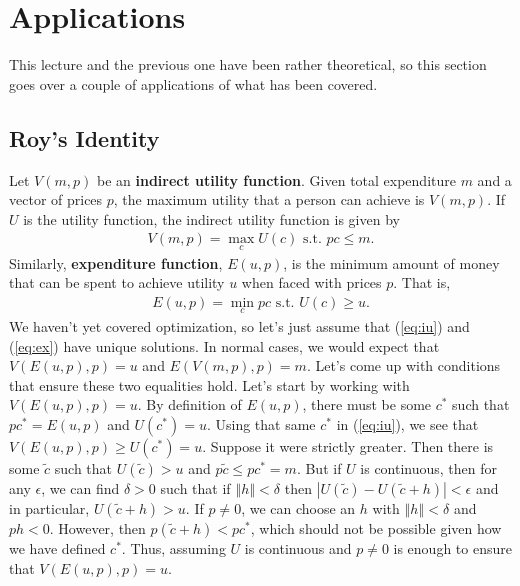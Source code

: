 \documentclass[12pt,reqno]{amsart}
\theoremstyle{definition}
\newcommand{\norm}[1]{\left\Vert {#1} \right\Vert}
\begin{document}
\section{Applications}

This lecture and the previous one have been rather theoretical, so
this section goes over a couple of applications of what has been
covered.

\subsection{Roy's Identity}

Let $V(m,p)$ be an \textbf{indirect utility function}. Given total
expenditure $m$ and a vector of prices $p$, the maximum utility that a
person can achieve is $V(m,p)$. If $U$ is the utility function, the
indirect utility function is given by
\begin{align}
  V(m,p) = \max_c U(c) \text{ s.t. } pc \leq m. \label{eq:iu}
\end{align}
Similarly,  \textbf{expenditure function}, $E(u,p)$, is the minimum
amount of money that can be spent to achieve utility $u$ when faced
with prices $p$. That is,
\begin{align}
  E(u,p) = \min_c pc \text{ s.t. } U(c) \geq u. \label{eq:ex}
\end{align}
We haven't yet covered optimization, so let's just assume that
(\ref{eq:iu}) and (\ref{eq:ex}) have unique solutions. In normal
cases, we would expect that $V(E(u,p),p) = u$ and $E(V(m,p),p) = m$.
Let's come up with conditions that ensure these two equalities
hold. Let's start by working with $V(E(u,p),p) = u$. By definition of
$E(u,p)$, there must be some $c^*$ such that $pc^* = E(u,p)$ and
$U(c^*) = u$. Using that same $c^*$ in (\ref{eq:iu}), we see that
$V(E(u,p),p) \geq U(c^*) = u$. Suppose it were strictly greater. Then
there is some $\tilde{c}$ such that $U(\tilde{c}) > u$ and $p\tilde{c}
\leq pc^* = m$. But if $U$ is continuous, then for any $\epsilon$, we
can find $\delta> 0$ such that if $\norm{h}<\delta$ then $|
U(\tilde{c}) - U(\tilde{c}+h)| < \epsilon$ and in particular,
$U(\tilde{c}+h)>u$. If $p \neq 0$, we can choose an $h$ with
$\norm{h}<\delta$ and $ph<0$. However, then $p(\tilde{c}+h) < pc^*$,
which should not be possible given how we have defined $c^*$. Thus,
assuming $U$ is continuous and $p \neq 0$ is enough to ensure that
$V(E(u,p),p) = u$. 
\end{document}
